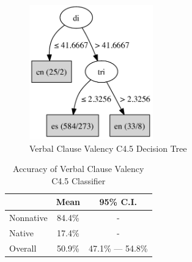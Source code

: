 \documentclass[main.tex]{subfiles}
\begin{document}
\begin{figure}[ht]
\centering
\includegraphics[width=2.1in]{c45-val.pdf}
\caption{Verbal Clause Valency C4.5 Decision Tree}
\label{fig:c4.5-val}
\end{figure}

\begin{table}[ht]
\centering
\caption{Accuracy of Verbal Clause Valency C4.5 Classifier}
\begin{tabular}{l c c}
\toprule
& Mean & 95\% C.I.\\
\midrule
Nonnative & 84.4\% & - \\
Native & 17.4\% & - \\
Overall & 50.9\% & 47.1\% --- 54.8\% \\
\bottomrule
\end{tabular}
\label{table:val-results}
\end{table}
\end{document}
